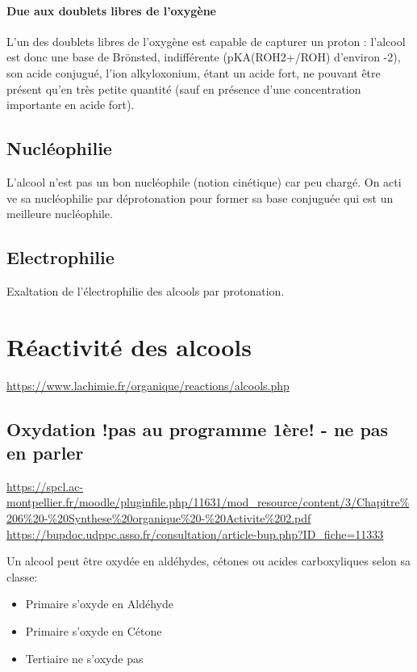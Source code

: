\documentclass[11pt]{report}
\numberwithin{figure}{section}
\numberwithin{equation}{section}
\numberwithin{table}{section}
\newcommand{\1}{\boldsymbol{1}}
\begin{document}
\paragraph{Due aux doublets libres de l'oxygène} 

L'un des doublets libres de l'oxygène est capable de capturer un proton : l'alcool est donc une base de Brönsted, indifférente (pKA(ROH2+/ROH) d'environ -2), son acide conjugué, l'ion alkyloxonium, étant un acide fort, ne pouvant être présent qu'en très petite quantité (sauf en présence d'une concentration importante en acide fort).

\subsection{Nucléophilie} L’alcool
n’est pas un bon nucléophile (notion cinétique) car peu chargé. On acti
ve sa nucléophilie par déprotonation pour former sa base conjuguée qui est un meilleure nucléophile.

\subsection{Electrophilie}

Exaltation de l’électrophilie des alcools par protonation.

\section{Réactivité des alcools}

\url{https://www.lachimie.fr/organique/reactions/alcools.php}

\subsection{Oxydation !pas au programme 1ère! - ne pas en parler}

\url{https://spcl.ac-montpellier.fr/moodle/pluginfile.php/11631/mod_resource/content/3/Chapitre%206%20-%20Synthese%20organique%20-%20Activite%202.pdf}
\url{https://bupdoc.udppc.asso.fr/consultation/article-bup.php?ID_fiche=11333}

Un alcool peut être oxydée en aldéhydes, cétones ou acides carboxyliques selon sa classe:
\begin{itemize}
\item Primaire s'oxyde en Aldéhyde
\item Primaire s'oxyde en Cétone
\item Tertiaire ne s'oxyde pas
\end{itemize}
\end{document}
